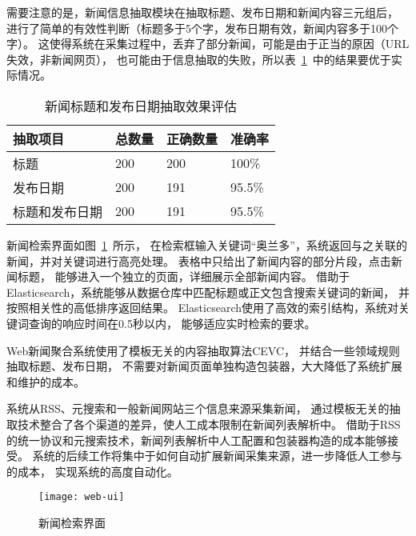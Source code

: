 需要注意的是，新闻信息抽取模块在抽取标题、发布日期和新闻内容三元组后，
进行了简单的有效性判断（标题多于5个字，发布日期有效，新闻内容多于100个字）。
这使得系统在采集过程中，丢弃了部分新闻，可能是由于正当的原因（URL失效，非新闻网页），
也可能由于信息抽取的失败，所以表~\ref{tbl:title-date}~中的结果要优于实际情况。

\begin{table}[htbp]
\caption{新闻标题和发布日期抽取效果评估}
\label{tbl:title-date}
\vspace{0.5em}\centering\wuhao
\begin{tabular}{llll}
\toprule[1.5pt]
抽取项目 & 总数量 & 正确数量 & 准确率 \\
\midrule[1pt]
标题 & 200 & 200 & 100\% \\
发布日期 & 200 & 191 & 95.5\% \\  
标题和发布日期 & 200 & 191 & 95.5\% \\
\bottomrule[1.5pt]
\end{tabular}
\end{table}

新闻检索界面如图~\ref{fig:web-ui}~所示，
在检索框输入关键词“奥兰多”，系统返回与之关联的新闻，并对关键词进行高亮处理。
表格中只给出了新闻内容的部分片段，点击新闻标题，
能够进入一个独立的页面，详细展示全部新闻内容。
借助于Elasticsearch，系统能够从数据仓库中匹配标题或正文包含搜索关键词的新闻，
并按照相关性的高低排序返回结果。
Elasticsearch使用了高效的索引结构，系统对关键词查询的响应时间在0.5秒以内，
能够适应实时检索的要求。

Web新闻聚合系统使用了模板无关的内容抽取算法CEVC，
并结合一些领域规则抽取标题、发布日期，
不需要对新闻页面单独构造包装器，大大降低了系统扩展和维护的成本。

系统从RSS、元搜索和一般新闻网站三个信息来源采集新闻，
通过模板无关的抽取技术整合了各个渠道的差异，使人工成本限制在新闻列表解析中。
借助于RSS的统一协议和元搜索技术，新闻列表解析中人工配置和包装器构造的成本能够接受。
系统的后续工作将集中于如何自动扩展新闻采集来源，进一步降低人工参与的成本，
实现系统的高度自动化。

\begin{figure}[htbp]
\centering
\texttt{[image: web-ui]}
\caption{新闻检索界面}
\label{fig:web-ui}
\end{figure}
